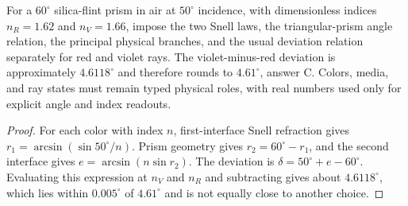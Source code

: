 \begin{theorem}
\label{thm:physics:phyx_mini_0008:target}
For a $60^\circ$ silica-flint prism in air at $50^\circ$ incidence, with
dimensionless indices $n_R=1.62$ and $n_V=1.66$, impose the two Snell laws,
the triangular-prism angle relation, the principal physical branches, and the
usual deviation relation separately for red and violet rays. The
violet-minus-red deviation is approximately $4.6118^\circ$ and therefore
rounds to $4.61^\circ$, answer C. Colors, media, and ray states must remain
typed physical roles, with real numbers used only for explicit angle and
index readouts.
\end{theorem}
\begin{proof}
For each color with index $n$, first-interface Snell refraction gives
$r_1=\arcsin(\sin 50^\circ/n)$. Prism geometry gives
$r_2=60^\circ-r_1$, and the second interface gives
$e=\arcsin(n\sin r_2)$. The deviation is
$\delta=50^\circ+e-60^\circ$. Evaluating this expression at $n_V$ and
$n_R$ and subtracting gives about $4.6118^\circ$, which lies within
$0.005^\circ$ of $4.61^\circ$ and is not equally close to another choice.
\end{proof}

